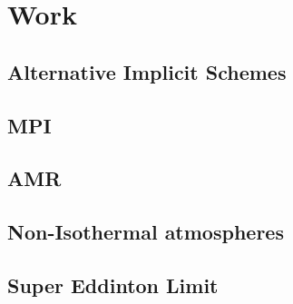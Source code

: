 \chapter{Work}

\section{Alternative Implicit Schemes}
\section{MPI}
\section{AMR}
\section{Non-Isothermal atmospheres}
\section{Super Eddinton Limit}